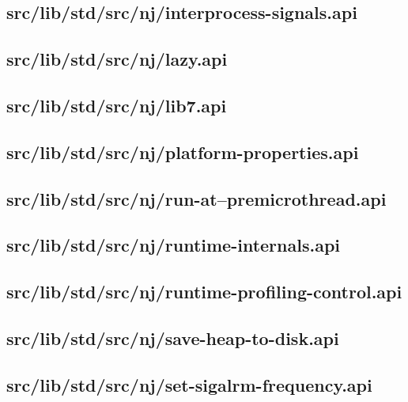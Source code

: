 \subsection{src/lib/std/src/nj/interprocess-signals.api}


\subsection{src/lib/std/src/nj/lazy.api}


\subsection{src/lib/std/src/nj/lib7.api}


\subsection{src/lib/std/src/nj/platform-properties.api}


\subsection{src/lib/std/src/nj/run-at--premicrothread.api}


\subsection{src/lib/std/src/nj/runtime-internals.api}


\subsection{src/lib/std/src/nj/runtime-profiling-control.api}


\subsection{src/lib/std/src/nj/save-heap-to-disk.api}


\subsection{src/lib/std/src/nj/set-sigalrm-frequency.api}


